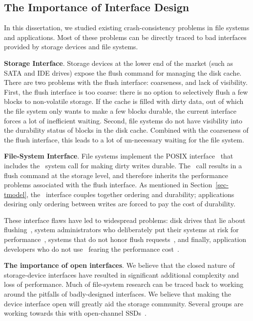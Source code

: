 \subsection{The Importance of Interface Design}
\label{sec-conc-lessons-interfaces}

In this dissertation, we studied existing crash-consistency problems
in file systems and applications. Most of these problems can be
directly traced to bad interfaces provided by storage devices and file
systems.  

\vspace{0.1in} \noindent \textbf{Storage Interface}. Storage devices
at the lower end of the market (such as SATA and IDE drives) expose
the flush command for managing the disk cache. There are two problems
with the flush interface: coarseness, and lack of visibility. First,
the flush interface is too coarse: there is no option to selectively
flush a few blocks to non-volatile storage. If the cache is filled
with dirty data, out of which the file system only wants to make a few
blocks durable, the current interface forces a lot of inefficient
waiting. Second, file systems do not have visibility into the
durability status of blocks in the disk cache. Combined with the
coarseness of the flush interface, this leads to a lot of un-necessary
waiting for the file system.   

\vspace{0.1in} \noindent \textbf{File-System Interface}. File systems
implement the POSIX interface~\cite{posix2013} that includes the
\sysfsync\ system call for making dirty writes durable. The \sysfsync\
call results in a flush command at the storage level, and therefore
inherits the performance problems associated with the flush interface.
As mentioned in Section~\ref{sec-tmodel}, the \sysfsync\ interface
couples together ordering and durability; applications desiring only
ordering between writes are forced to pay the cost of durability. 

These interface flaws have led to widespread problems: disk drives
that lie about flushing~\cite{RajimwaleEtAl11-CCE, URLMacFsync},
system administrators who deliberately put their systems at risk for
performance~\cite{URLmassivefsthread}, systems that do not honor flush
requests~\cite{virtualbox-ignoreflush}, and finally, application
developers who do not use \sysfsync\ fearing the performance
cost~\cite{tso-fsync}.


\vspace{0.1in} \noindent \textbf{The importance of open interfaces}.
We believe that the closed nature of storage-device interfaces have
resulted in significant additional complexity and loss of performance.
Much of file-system research can be traced back to working around the
pitfalls of badly-designed interfaces. We believe that making the
device interface open will greatly aid the storage community. Several
groups are working towards this with open-channel
SSDs~\cite{shin2015providing, ouyang2014sdf, wang2014efficient}.

